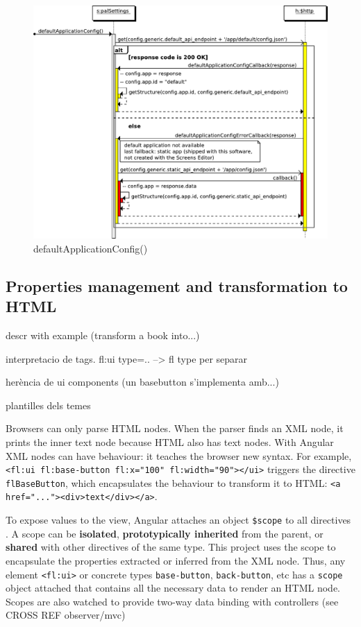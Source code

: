 \begin{figure}
    \centering
    \includegraphics{figures/design/seqdia/palSettings-defaultApplicationConfig.pdf}
    \caption{defaultApplicationConfig()}
    \label{fig:design-seqdia-palSettings-defaultApplicationConfig}
\end{figure}

\FloatBarrier

\subsection{Properties management and transformation to \ac{HTML}}
descr with example (transform a  book into...)

interpretacio de tags. fl:ui type=.. --> fl {type} per separar

herència de ui components (un basebutton s'implementa amb...)

plantilles dels temes

Browsers can only parse \ac{HTML} nodes.
When the parser finds an \ac{XML} node, it prints the inner text node because \ac{HTML} also has text nodes.
With Angular \ac{XML} nodes can have behaviour: it teaches the browser new syntax.
For example, \lstinline$<fl:ui fl:base-button fl:x="100" fl:width="90"></ui>$ triggers the directive \lstinline$flBaseButton$, which encapsulates the behaviour to transform it to \ac{HTML}: \lstinline$<a href="..."><div>text</div></a>$.

To expose values to the view, Angular attaches an object \texttt{\$scope} to all directives  .
A scope can be \textbf{isolated}, \textbf{prototypically inherited} from the parent, or \textbf{shared} with other directives of the same type.
This project uses the scope to encapsulate the properties extracted or inferred from the \ac{XML} node.
Thus, any element \lstinline$<fl:ui>$ or concrete types \lstinline$base-button$, \lstinline$back-button$, etc has a \texttt{scope} object attached that contains all the necessary data to render an \ac{HTML} node.
Scopes are also watched to provide two-way data binding with controllers (see CROSS REF observer/mvc)

